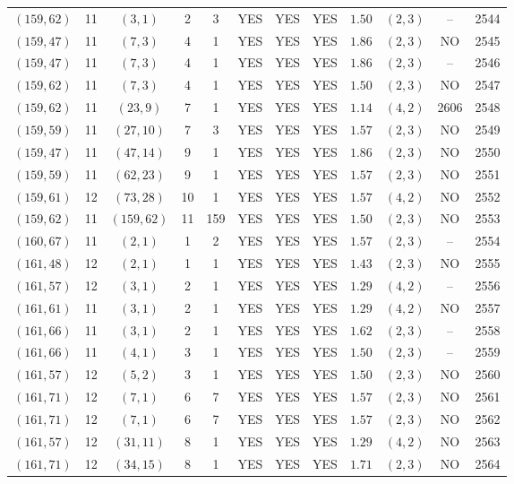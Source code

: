 \begin{longtable}{|c|c|c|c|c|c|c|c|c|c|c|c|}
$(159,62)$ & 11 & $(3,1)$ & 2 & 3 & YES & YES & YES & $1.50$ & $(2,3)$ & -- & 2544\\
$(159,47)$ & 11 & $(7,3)$ & 4 & 1 & YES & YES & YES & $1.86$ & $(2,3)$ & NO & 2545\\
$(159,47)$ & 11 & $(7,3)$ & 4 & 1 & YES & YES & YES & $1.86$ & $(2,3)$ & -- & 2546\\
$(159,62)$ & 11 & $(7,3)$ & 4 & 1 & YES & YES & YES & $1.50$ & $(2,3)$ & NO & 2547\\
$(159,62)$ & 11 & $(23,9)$ & 7 & 1 & YES & YES & YES & $1.14$ & $(4,2)$ & 2606 & 2548\\
$(159,59)$ & 11 & $(27,10)$ & 7 & 3 & YES & YES & YES & $1.57$ & $(2,3)$ & NO & 2549\\
$(159,47)$ & 11 & $(47,14)$ & 9 & 1 & YES & YES & YES & $1.86$ & $(2,3)$ & NO & 2550\\
$(159,59)$ & 11 & $(62,23)$ & 9 & 1 & YES & YES & YES & $1.57$ & $(2,3)$ & NO & 2551\\
$(159,61)$ & 12 & $(73,28)$ & 10 & 1 & YES & YES & YES & $1.57$ & $(4,2)$ & NO & 2552\\
$(159,62)$ & 11 & $(159,62)$ & 11 & 159 & YES & YES & YES & $1.50$ & $(2,3)$ & NO & 2553\\
$(160,67)$ & 11 & $(2,1)$ & 1 & 2 & YES & YES & YES & $1.57$ & $(2,3)$ & -- & 2554\\
$(161,48)$ & 12 & $(2,1)$ & 1 & 1 & YES & YES & YES & $1.43$ & $(2,3)$ & NO & 2555\\
$(161,57)$ & 12 & $(3,1)$ & 2 & 1 & YES & YES & YES & $1.29$ & $(4,2)$ & -- & 2556\\
$(161,61)$ & 11 & $(3,1)$ & 2 & 1 & YES & YES & YES & $1.29$ & $(4,2)$ & NO & 2557\\
$(161,66)$ & 11 & $(3,1)$ & 2 & 1 & YES & YES & YES & $1.62$ & $(2,3)$ & -- & 2558\\
$(161,66)$ & 11 & $(4,1)$ & 3 & 1 & YES & YES & YES & $1.50$ & $(2,3)$ & -- & 2559\\
$(161,57)$ & 12 & $(5,2)$ & 3 & 1 & YES & YES & YES & $1.50$ & $(2,3)$ & NO & 2560\\
$(161,71)$ & 12 & $(7,1)$ & 6 & 7 & YES & YES & YES & $1.57$ & $(2,3)$ & NO & 2561\\
$(161,71)$ & 12 & $(7,1)$ & 6 & 7 & YES & YES & YES & $1.57$ & $(2,3)$ & NO & 2562\\
$(161,57)$ & 12 & $(31,11)$ & 8 & 1 & YES & YES & YES & $1.29$ & $(4,2)$ & NO & 2563\\
$(161,71)$ & 12 & $(34,15)$ & 8 & 1 & YES & YES & YES & $1.71$ & $(2,3)$ & NO & 2564\\

\end{longtable}

